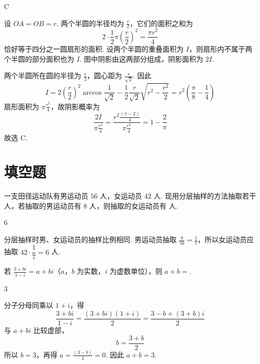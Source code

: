 \begin{answer}
C
\end{answer}

\begin{solution}
设 \(OA=OB=r\). 两个半圆的半径均为 \(\frac{r}{2}\)，它们的面积之和为
\[
2\cdot\frac12\pi\left(\frac r2\right)^{2}=\frac{\pi r^{2}}4
\]
恰好等于四分之一圆扇形的面积. 设两个半圆的重叠面积为 \(I\)，则扇形内不属于两个半圆的部分面积也为 \(I\). 图中阴影由这两部分组成，阴影面积为 \(2I\).

两个半圆所在圆的半径为 \(\frac{r}{2}\)，圆心距为 \(\frac{r}{\sqrt2}\). 因此
\[
I=2\left(\frac r2\right)^{2}\arccos\frac1{\sqrt2}-\frac12\frac r{\sqrt2}\sqrt{r^{2}-\frac{r^{2}}2}
 =r^{2}\left(\frac\pi8-\frac14\right)
\]
扇形面积为 \(\pi \frac{r^{2}}{4}\)，故阴影概率为
\[
\frac{2I}{\pi \frac{r^{2}}{4}}=\frac{r^{2}\frac{(\pi-2)}{4}}{\pi \frac{r^{2}}{4}}=1-\frac2\pi
\]
故选 C.
\end{solution}

\section{填空题}

\begin{problem}
一支田径运动队有男运动员 \(56\) 人，女运动员 \(42\) 人. 现用分层抽样的方法抽取若干人，若抽取的男运动员有 \(8\) 人，则抽取的女运动员有\fillinblank{} 人.
\end{problem}

\begin{answer}
\(6\)
\end{answer}

\begin{solution}
分层抽样时男、女运动员的抽样比例相同. 男运动员抽取 \(\frac{8}{56}=\frac{1}{7}\)，所以女运动员应抽取 \(42\cdot\dfrac17=6\) 人.
\end{solution}

\begin{problem}
若 \(\frac{3 + bi}{1 - i} = a + bi\)（\(a\)，\(b\) 为实数，\(i\) 为虚数单位），则 \(a + b =\)\fillinblank{}.
\end{problem}

\begin{answer}
\(3\)
\end{answer}

\begin{solution}
分子分母同乘以 \(1+i\)，得
\[
\frac{3+bi}{1-i}=\frac{(3+bi)(1+i)}2=\frac{3-b+(3+b)i}{2}
\]
与 \(a+bi\) 比较虚部，
\[
b=\frac{3+b}{2}
\]
所以 \(b=3\)，再得 \(a=\frac{(3-b)}{2}=0\). 因此 \(a+b=3\).
\end{solution}

